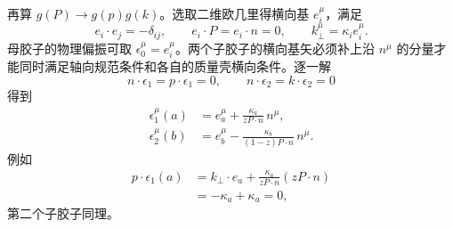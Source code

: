 \begin{derivation}[最低阶部分子分裂核]
再算 $g(P)\to g(p)g(k)$。选取二维欧几里得横向基 $e_i^\mu$，满足
\begin{equation*}
 e_i\cdot e_j=-\delta_{ij},
 \qquad e_i\cdot P=e_i\cdot n=0,
 \qquad k_\perp^\mu=\kappa_i e_i^\mu.
\end{equation*}
母胶子的物理偏振可取 $\epsilon_0^\mu=e_i^\mu$。两个子胶子的横向基矢必须补上沿 $n^\mu$ 的分量才能同时满足轴向规范条件和各自的质量壳横向条件。逐一解
\begin{equation*}
 n\cdot\epsilon_1=p\cdot\epsilon_1=0,
 \qquad
 n\cdot\epsilon_2=k\cdot\epsilon_2=0
\end{equation*}
得到
\begin{align*}
 \epsilon_1^\mu(a)
 &=e_a^\mu+\frac{\kappa_a}{zP\cdot n}\,n^\mu,\\
 \epsilon_2^\mu(b)
 &=e_b^\mu-\frac{\kappa_b}{(1-z)P\cdot n}\,n^\mu.
\end{align*}
例如
\begin{align*}
 p\cdot\epsilon_1(a)
 &=k_\perp\cdot e_a
 +\frac{\kappa_a}{zP\cdot n}(zP\cdot n)\\
 &=-\kappa_a+\kappa_a=0,
\end{align*}
第二个子胶子同理。


\end{derivation}
